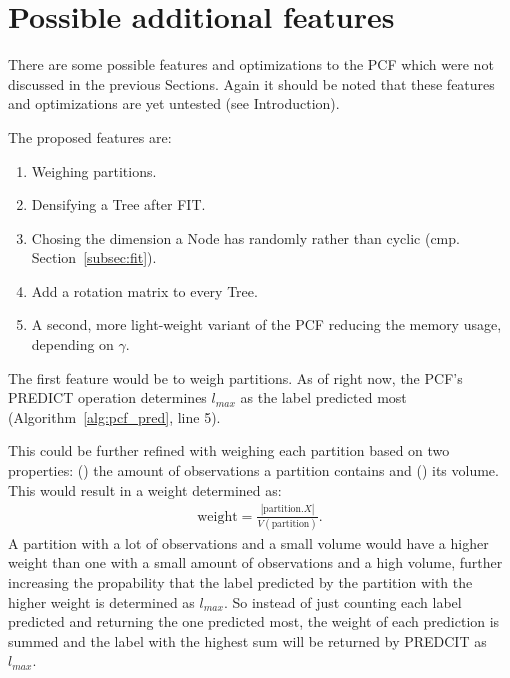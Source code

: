 \section{Possible additional features}
\label{sec:features}

There are some possible features and optimizations to the
PCF which were not discussed in the previous Sections.
Again it should be noted that these features and
optimizations are yet untested (see Introduction).

The proposed features are:

\begin{enumerate}

  \item Weighing partitions.

  \item Densifying a Tree after FIT.

  \item Chosing the dimension a Node has randomly rather
        than cyclic (cmp. Section~\ref{subsec:fit}).

  \item Add a rotation matrix to every Tree.

  \item A second, more light-weight variant of the PCF
        reducing the memory usage, depending on $\gamma$.

\end{enumerate}

The first feature would be to weigh partitions. As of
right now, the PCF's PREDICT operation determines $l_{max}$
as the label predicted most (Algorithm~\ref{alg:pcf_pred},
line 5).

This could be further refined with weighing each partition
based on two properties: () the amount
of observations a partition contains and ()
its volume. This would result in a weight determined as:
\begin{align}
  \text{weight} = \frac{|\text{partition}.X|}
  {V(\text{partition})}.
\end{align}
A partition with a lot of observations and a small
volume would have a higher weight than one with a small
amount of observations and a high volume, further
increasing the propability that the label predicted by the
partition with the higher weight is determined as
$l_{max}$. So instead of just counting each label predicted
and returning the one predicted most, the weight of each
prediction is summed and the label with the highest sum
will be returned by PREDCIT as $l_{max}$.

